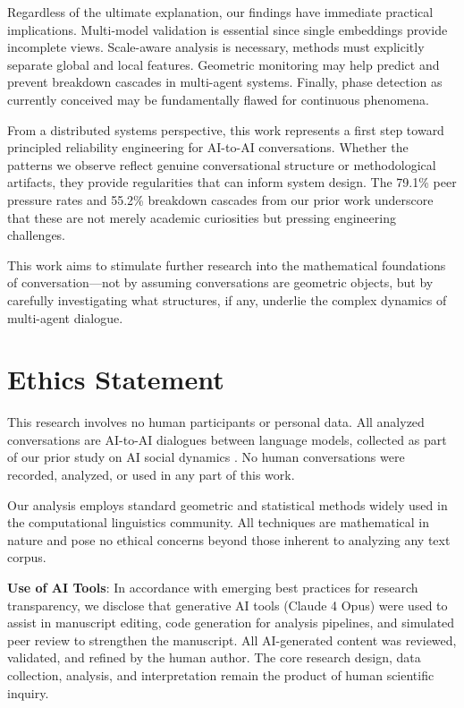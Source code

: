 \documentclass[11pt,letterpaper]{article}
\begin{document}
Regardless of the ultimate explanation, our findings have immediate practical implications. Multi-model validation is essential since single embeddings provide incomplete views. Scale-aware analysis is necessary, methods must explicitly separate global and local features. Geometric monitoring may help predict and prevent breakdown cascades in multi-agent systems. Finally, phase detection as currently conceived may be fundamentally flawed for continuous phenomena.

From a distributed systems perspective, this work represents a first step toward principled reliability engineering for AI-to-AI conversations. Whether the patterns we observe reflect genuine conversational structure or methodological artifacts, they provide regularities that can inform system design. The 79.1\% peer pressure rates and 55.2\% breakdown cascades from our prior work underscore that these are not merely academic curiosities but pressing engineering challenges.

This work aims to stimulate further research into the mathematical foundations of conversation—not by assuming conversations are geometric objects, but by carefully investigating what structures, if any, underlie the complex dynamics of multi-agent dialogue.

\section{Ethics Statement}

This research involves no human participants or personal data. All analyzed conversations are AI-to-AI dialogues between language models, collected as part of our prior study on AI social dynamics \citep{garcia2025peer}. No human conversations were recorded, analyzed, or used in any part of this work.

Our analysis employs standard geometric and statistical methods widely used in the computational linguistics community. All techniques are mathematical in nature and pose no ethical concerns beyond those inherent to analyzing any text corpus.

\textbf{Use of AI Tools}: In accordance with emerging best practices for research transparency, we disclose that generative AI tools (Claude 4 Opus) were used to assist in manuscript editing, code generation for analysis pipelines, and simulated peer review to strengthen the manuscript. All AI-generated content was reviewed, validated, and refined by the human author. The core research design, data collection, analysis, and interpretation remain the product of human scientific inquiry.
\end{document}
